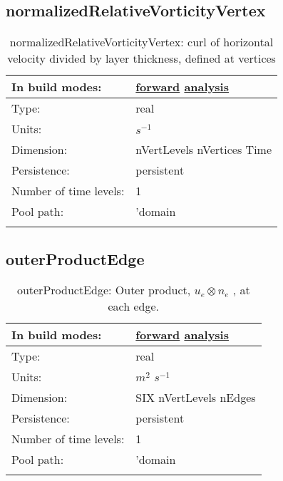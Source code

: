 \subsection[normalizedRelativeVorticityVertex]{normalizedRelativeVorticityVertex}
\label{subsec:var_sec_scratch_normalizedRelativeVorticityVertex}
\begin{center}
\begin{longtable}{| p{2.0in} | p{4.0in} |}
        \hline 
        In build modes: & \hyperref[subsec:forward_var_tab_scratch]{forward} \hyperref[subsec:analysis_var_tab_scratch]{analysis} \\
        \hline 
        Type: & real \\
        \hline 
        Units: & $s^{-1}$ \\
        \hline 
        Dimension: & nVertLevels nVertices Time \\
        \hline 
        Persistence: & persistent \\
        \hline 
        Number of time levels: & 1 \\
        \hline 
            Pool path: & 'domain %
 \\
		 \hline 
    \caption{normalizedRelativeVorticityVertex: curl of horizontal velocity divided by layer thickness, defined at vertices}
\end{longtable}
\end{center}
\subsection[outerProductEdge]{outerProductEdge}
\label{subsec:var_sec_scratch_outerProductEdge}
\begin{center}
\begin{longtable}{| p{2.0in} | p{4.0in} |}
        \hline 
        In build modes: & \hyperref[subsec:forward_var_tab_scratch]{forward} \hyperref[subsec:analysis_var_tab_scratch]{analysis} \\
        \hline 
        Type: & real \\
        \hline 
        Units: & $m^2$ $s^{-1}$ \\
        \hline 
        Dimension: & SIX nVertLevels nEdges \\
        \hline 
        Persistence: & persistent \\
        \hline 
        Number of time levels: & 1 \\
        \hline 
            Pool path: & 'domain %
 \\
		 \hline 
    \caption{outerProductEdge:  Outer product,  $u_e \otimes n_e$ , at each edge.}
\end{longtable}
\end{center}
